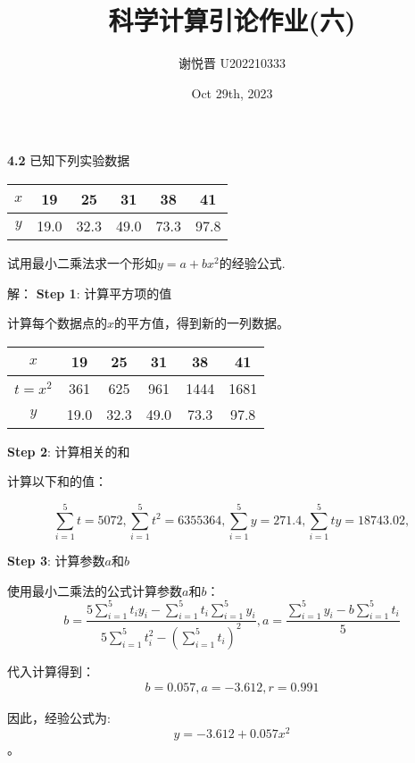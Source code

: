 \documentclass[a4paper,11pt,UTF8]{article}
\title{科学计算引论作业(六)}
\author{谢悦晋 \quad U202210333}
\date{Oct 29th, 2023 }
\begin{document}
\maketitle
\textbf{4.2} 已知下列实验数据
\begin{table}[H]
	\centering
	\begin{tabular}{|c|c|c|c|c|c|}
	\hline
	$x$ & 19 & 25 & 31 & 38 & 41\\
	\hline
	$y$\textsf{} & 19.0 & 32.3 & 49.0 &73.3 & 97.8\\
	\hline
	\end{tabular}
\end{table}
试用最小二乘法求一个形如$y=a+bx^2$的经验公式.

\noindent 解：
\textbf{Step 1}: 计算平方项的值

计算每个数据点的$x$的平方值，得到新的一列数据。

\begin{table}[H]
	\centering
	\begin{tabular}{|c|c|c|c|c|c|}
		\hline
		$x$ & 19 & 25 & 31 & 38 & 41\\
		\hline
		$t=x^2$ & 361 & 625 & 961 & 1444 & 1681\\
		\hline
		$y$\textsf{} & 19.0 & 32.3 & 49.0 &73.3 & 97.8\\
		\hline
	\end{tabular}
\end{table}

\textbf{Step 2}: 计算相关的和

计算以下和的值：

$$
	\sum_{i=1}^5{t} = 5072,
	\sum_{i=1}^5{t^2} = 6355364,
	\sum_{i=1}^5{y} = 271.4,
	\sum_{i=1}^5{ty} = 18743.02,
$$

\textbf{Step 3}: 计算参数$a$和$b$

使用最小二乘法的公式计算参数$a$和$b$：
$$
	b = \frac{\displaystyle 5\sum_{i=1}^5{t_iy_i} - \sum_{i=1}^5{t_i}\sum_{i=1}^5{y_i}}{\displaystyle 5\sum_{i=1}^5{t_i^2} - (\sum_{i=1}^5{t_i})^2}, a = \frac{\displaystyle\sum_{i=1}^5{y_i} - b\sum_{i=1}^5{t_i}}{5}
$$

代入计算得到：
$$
\begin{aligned}
	b = 0.057,a = -3.612,r=0.991
\end{aligned}
$$

因此，经验公式为:
$$y =-3.612+0.057x^2$$。
\end{document}
